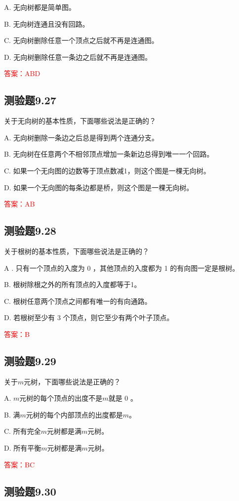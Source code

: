 \documentclass[UTF8, heading=true]{ctexart}
\begin{document}
A. 无向树都是简单图。

B. 无向树连通且没有回路。

C. 无向树删除任意一个顶点之后就不再是连通图。

D. 无向树删除任意一条边之后就不再是连通图。


\textcolor{red}{答案：ABD}

\subsection{测验题9.27}

关于无向树的基本性质，下面哪些说法是正确的？

A. 无向树删除一条边之后总是得到两个连通分支。

B. 无向树在任意两个不相邻顶点增加一条新边总得到唯一一个回路。

C. 如果一个无向图的边数等于顶点数减1，则这个图是一棵无向树。

D. 如果一个无向图的每条边都是桥，则这个图是一棵无向树。

\textcolor{red}{答案：AB}

\subsection{测验题9.28}

关于根树的基本性质，下面哪些说法是正确的？

A . 只有一个顶点的入度为 0 ，其他顶点的入度都为 1 的有向图一定是根树。

B. 根树除根之外的所有顶点的入度都等于1。

C. 根树任意两个顶点之间都有唯一的有向通路。

D. 若根树至少有 3 个顶点，则它至少有两个叶子顶点。

\textcolor{red}{答案：B}

\subsection{测验题9.29}

关于$m$元树，下面哪些说法是正确的？

A. $m$元树的每个顶点的出度不是$m$就是 0 。

B. 满$m$元树的每个内部顶点的出度都是$m$。

C. 所有完全$m$元树都是满$m$元树。

D. 所有平衡$m$元树都是满$m$元树。


\textcolor{red}{答案：BC}

\subsection{测验题9.30}
\end{document}
